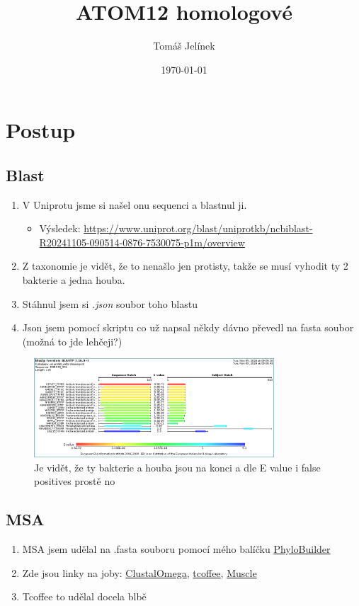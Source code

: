 \documentclass{article}
\title{ATOM12 homologové}
\author{Tomáš Jelínek}
\date{\today}
\begin{document}
\maketitle


\section*{Postup}

\subsection*{Blast}
\begin{enumerate}
\item V Uniprotu jsme si našel onu sequenci a blastnul ji.
    \begin{itemize}
        \item Výsledek: \url{https://www.uniprot.org/blast/uniprotkb/ncbiblast-R20241105-090514-0876-7530075-p1m/overview}
    \end{itemize}
\item Z taxonomie je vidět, že to nenašlo jen protisty, takže se musí vyhodit ty 2 bakterie a jedna houba.
\item Stáhnul jsem si \textit{.json} soubor toho blastu
\item Json jsem pomocí skriptu co už napsal někdy dávno převedl na fasta soubor (možná to jde lehčeji?)
\end{enumerate}

\begin{figure}[H]
    \centering
    \includegraphics[width=0.8\textwidth]{vizualiazce.png}
    \caption{Je vidět, že ty bakterie a houba jsou na konci a dle E value i false positives prostě no}
    \label{fig:blast}
\end{figure}

\subsection*{MSA}

\begin{enumerate}
    \item MSA jsem udělal na .fasta souboru pomocí mého balíčku \href{https://github.com/Desperadus/PhyloBuilder}{PhyloBuilder}
    \item Zde jsou linky na joby: \href{http://www.ebi.ac.uk/jdispatcher/msa/clustalo/summary?jobId=clustalo-R20241105-161354-0975-92954007-p1m}{ClustalOmega}, \href{http://www.ebi.ac.uk/jdispatcher/msa/tcoffee/summary?jobId=tcoffee-R20241105-161452-0271-17506642-p1m}{tcoffee}, \href{http://www.ebi.ac.uk/jdispatcher/msa/muscle/summary?jobId=muscle-R20241105-161613-0467-63803921-p1m}{Muscle} 
    \item Tcoffee to udělal docela blbě
\end{enumerate}
\end{document}
